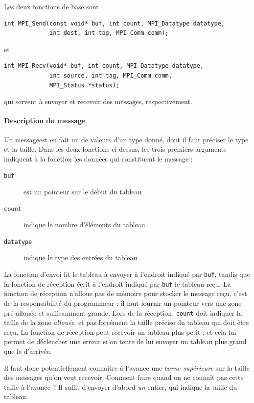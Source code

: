 Les deux fonctions de base sont :
\begin{verbatim}
int MPI_Send(const void* buf, int count, MPI_Datatype datatype,
             int dest, int tag, MPI_Comm comm);
\end{verbatim}
et
\begin{verbatim}
int MPI_Recv(void* buf, int count, MPI_Datatype datatype,
             int source, int tag, MPI_Comm comm,
             MPI_Status *status);
\end{verbatim}
qui servent à envoyer et recevoir des messages, respectivement.

\paragraph{Description du message} Un \og message\fg est en fait un
 de valeurs d'un type donné, dont il faut préciser le type et
la taille. Dans les deux fonctions ci-dessus, les trois premiers arguments
indiquent à la fonction les données qui constituent le message :
\begin{description}
\item[\texttt{buf}] est un pointeur sur le début du tableau
\item[\texttt{count}] indique le nombre d'éléments du tableau
\item[\texttt{datatype}] indique le type des entrées du tableau
\end{description}

La fonction d'envoi lit le tableau à envoyer à l'endroit indiqué par
\texttt{buf}, tandis que la fonction de réception écrit à l'endroit indiqué par
\texttt{buf} le tableau reçu. La fonction de réception n'alloue pas de mémoire
pour stocker le message reçu, c'est de la responsabilité du programmeur : il
faut fournir un pointeur vers une zone pré-allouée et suffisamment grande. Lors
de la réception, \texttt{count} doit indiquer la taille de la zone
\emph{allouée}, et pas forcément la taille précise du tableau qui doit être
reçu. La fonction de réception peut recevoir un tableau plus petit ; et cela lui
permet de déclencher une erreur si on tente de lui envoyer un tableau plus grand
que le  d'arrivée.

Il faut donc potentiellement connaître à l'avance une \emph{borne supérieure}
sur la taille des messages qu'on veut recevoir. Comment faire quand on ne
connaît pas cette taille à l'avance ? Il suffit d'envoyer d'abord \emph{un}
entier, qui indique la taille du tableau.

